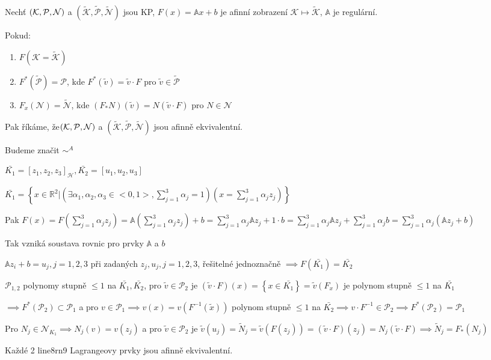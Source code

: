 \documentclass[../main.tex]{subfiles}
\begin{document}
\begin{definition}
    Nechť $(\mathcal{K}, \mathcal{P}, \mathcal{N})$ a $(\tilde{\mathcal{K}}, \tilde{\mathcal{P}}, \tilde{\mathcal{N}})$ jsou KP, $F(x) = \mathbb{A}x + b$ je afinní zobrazení $\mathcal{K} \mapsto \tilde{\mathcal{K}}$, $\mathbb{A}$ je regulární.

    Pokud: \begin{enumerate}
        \item $F(\mathcal{K} = \tilde{\mathcal{K}})$
        \item $F^* (\tilde{\mathcal{P}}) = \mathcal{P}$, kde $F^*(\tilde{v}) = \tilde{v}\cdot F $ pro $\tilde{v}\in\tilde{\mathcal{P}}$
        \item $F_x (\mathcal{N}) = \tilde{\mathcal{N}}$, kde $(F_* N)(\tilde{v}) = N(\tilde{v}\cdot F)$ pro $N\in\mathcal{N}$
    \end{enumerate}

    Pak říkáme, že$(\mathcal{K}, \mathcal{P}, \mathcal{N})$ a $(\tilde{\mathcal{K}}, \tilde{\mathcal{P}}, \tilde{\mathcal{N}})$ jsou afinně ekvivalentní. 

    Budeme značit $\sim^A$

\end{definition}

\begin{example}
    $\bar{K_1} = \left[z_1, z_2, z_3\right]_\mathcal{H}, \bar{K_2} = \left[u_1, u_2, u_3\right]$

    $\bar{K_1} = \left\{x\in\mathbb{R}^2| (\exists \alpha_1, \alpha_2, \alpha_3 \in <0,1>, \sum_{j=1}^3 \alpha_j=1)(x = \sum_{j=1}^3 \alpha_j z_j)\right\}$
    
    Pak $F(x) = F(\sum_{j=1}^3 \alpha_j z_j)  = \mathbb{A}(\sum_{j=1}^3 \alpha_j z_j) + b = \sum_{j=1}^3 \alpha_j \mathbb{A}z_j + 1 \cdot b =  \sum_{j=1}^3 \alpha_j \mathbb{A}z_j + \sum_{j=1}^3 \alpha_j b = \sum_{j=1}^3 \alpha_j(\mathbb{A} z_j + b)$

    Tak vzniká soustava rovnic pro prvky $\mathbb{A}$ a $b$

    $\mathbb{A} z_i + b = u_j, j = 1,2,3$ při zadaných $z_j, u_j, j=1,2,3$, řešitelné jednoznačně $\implies F(\bar{K_1} )= \bar{K_2}$

    $\mathcal{P}_{1,2}$ polynomy stupně $\leq 1$ na $\bar{K_1}, \bar{K_2}$, pro $\tilde{v}\in\mathcal{P}_2$ je $(\tilde{v}\cdot F)(x) = \left\{ x\in\bar{K_1}\right\} = \tilde{v}(F_x)$ je polynom stupně $\leq 1$ na $\bar{K_1}$

    $\implies F^* (\mathcal{P}_2) \subset \mathcal{P}_1$ a pro $v\in\mathcal{P_1} \implies v(x) = v(F^{-1}(\tilde{x}))$ polynom stupně $\leq 1 $ na $\bar{K_2} \implies v \cdot F^{-1} \in \mathcal{P}_2 \implies F^*(\mathcal{P}_2) = \mathcal{P}_1   $
    
    Pro $N_j \in \mathcal{N}_{K_1} \implies N_j(v) = v(z_j)$ a pro $\tilde{v}\in\mathcal{P}_2$ je $\tilde{v}(u_j) = \tilde{N}_j = \tilde{v}(F(z_j)) = (\tilde{v}\cdot F)(z_j) = N_j (\tilde{v}\cdot F) \implies \tilde{N}_j = F_*(N_j)$

    Každé 2 line8rn9 Lagrangeovy prvky jsou afinně ekvivalentní. 
\end{example}
\end{document}
